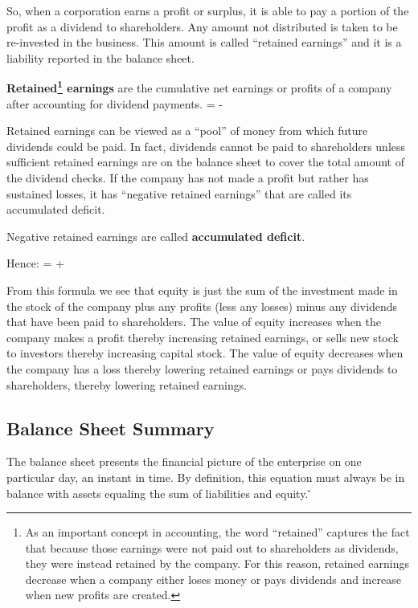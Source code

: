 So, when a corporation earns a profit or surplus, it is able to pay a portion of the profit as a dividend to
shareholders. Any amount not distributed is taken to be re-invested in the business. This amount is called ``retained
earnings'' and it is a liability reported in the balance sheet.

\textbf{Retained\footnote{As an important concept in accounting, the word ``retained'' captures the fact that because
those earnings were not paid out to shareholders as dividends, they were instead retained by the company. For this
reason, retained earnings decrease when a company either loses money or pays dividends and increase when new profits
are created.} earnings} are the cumulative net earnings or profits of a company after accounting for dividend
payments.
\bse
{} =  - 
\ese
\ed

Retained earnings can be viewed as a ``pool'' of money from which future dividends could be paid. In fact, dividends
cannot be paid to shareholders unless sufficient retained earnings are on the balance sheet to cover the total amount
of the dividend checks. If the company has not made a profit but rather has sustained losses, it has ``negative
retained earnings'' that are called its accumulated deficit.

Negative retained earnings are called \textbf{accumulated deficit}.
\ed

Hence:
\bse
{} =  + 
\ese

From this formula we see that equity is just the sum of the investment made in the stock of the company plus any
profits (less any losses) minus any dividends that have been paid to shareholders. The value of equity increases when
the company makes a profit thereby increasing retained earnings, or sells new stock to investors thereby increasing
capital stock. The value of equity decreases when the company has a loss thereby lowering retained earnings or pays
dividends to shareholders, thereby lowering retained earnings.

\subsection{Balance Sheet Summary}


The balance sheet presents the financial picture of the enterprise on one particular day, an instant in time. By
definition, this equation must always be in balance with assets equaling the sum of liabilities and equity. \v

